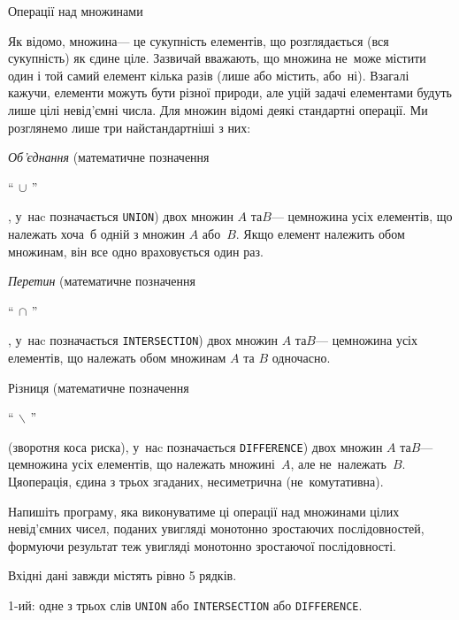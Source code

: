 ﻿\begin{problemAllDefault}{Операції над множинами}

\begin{small}

Як відомо, множина\nolinebreak[3] --- це сукупність елементів, що розглядається (вся сукупність) як єдине ціле. Зазвичай вважають, що множина не~може містити один і той самий елемент кілька разів (лише або містить, або~ні). Взагалі кажучи, елементи можуть бути різної природи, але у\nolinebreak[3] цій задачі елементами будуть лише цілі невід'ємні числа. Для множин відомі деякі стандартні операції. Ми розглянемо лише три найстандартніші з них:

\emph{Об'єднання} (математичне позначення  \begin{large}``$\,\cup\,$''\end{large}, у~наc позначається \texttt{UNION}) двох множин $A$ та\nolinebreak[2] $B$\nolinebreak[3] --- це\nolinebreak[2] множина усіх елементів, що належать хоча~б одній з множин $A$ або~$B$. Якщо елемент належить обом множинам, він все одно враховується один раз.

\emph{Перетин} (математичне позначення  \begin{large}``$\,\cap\,$''\end{large}, у~наc позначається \texttt{INTERSECTION}) двох множин $A$ та\nolinebreak[2] $B$\nolinebreak[3] --- це\nolinebreak[2] множина усіх елементів, що належать обом множинам $A$ та $B$ одночасно.

Різниця (математичне позначення \begin{large}``$\,\backslash\,$''\end{large} (зворотня коса риска), у~наc позначається \texttt{DIFFERENCE}) двох множин $A$ та\nolinebreak[2] $B$\nolinebreak[3] --- це\nolinebreak[2] множина  усіх елементів, що належать множині~$A$, але не~належать~$B$. Ця\nolinebreak[3] операція, єдина з трьох згаданих, несиметрична (не~комутативна).

Напишіть програму, яка виконуватиме ці операції над множинами цілих невід'ємних чисел, поданих у\nolinebreak[3] вигляді монотонно зростаючих послідовностей, формуючи результат теж у\nolinebreak[3] вигляді монотонно зростаючої послідовності.

\begin{multicols}{2}

\InputFile
Вхідні дані завжди містять рівно 5 рядків.

1-ий: одне з трьох слів \texttt{UNION} або \texttt{INTERSECTION} або \texttt{DIFFERENCE}.


\end{multicols}
\end{small}
\end{problemAllDefault}
